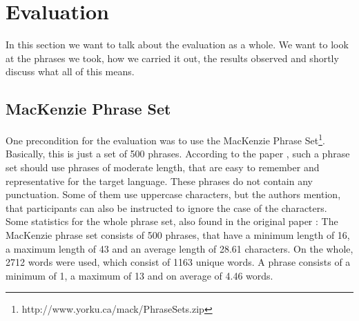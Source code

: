 \chapter{Evaluation}

In this section we want to talk about the evaluation as a whole. We want to look at the phrases we took, how we carried it out, the results observed and shortly discuss what all of this means.

\section{MacKenzie Phrase Set}
One precondition for the evaluation was to use the MacKenzie Phrase Set\footnote{http://www.yorku.ca/mack/PhraseSets.zip}. Basically, this is just a set of 500 phrases. According to the paper \cite{10.1145/765891.765971}, such a phrase set should use phrases of moderate length, that are easy to remember and representative for the target language. These phrases do not contain any punctuation. Some of them use uppercase characters, but the authors mention, that participants can also be instructed to ignore the case of the characters. 
\\
Some statistics for the whole phrase set, also found in the original paper \cite{10.1145/765891.765971}: The MacKenzie phrase set consists of 500 phrases, that have a minimum length of 16, a maximum length of 43 and an average length of 28.61 characters. On the whole, 2712 words were used, which consist of 1163 unique words. A phrase consists of a minimum of 1, a maximum of 13 and on average of 4.46 words.

